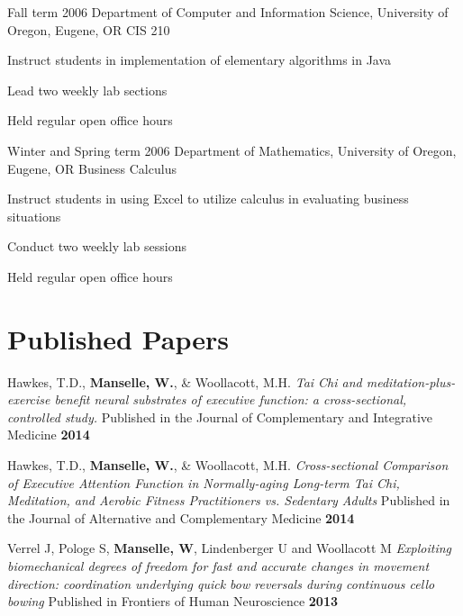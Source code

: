 \documentclass[10pt]{article} %
\begin{document}
\begin{itemize-noindent}

\job
{Fall term 2006}
{Department of Computer and Information Science, University of Oregon, Eugene, OR}
{CIS 210}

\begin{itemize-noindent}
\item{Instruct students in implementation of elementary algorithms in Java}
\item{Lead two weekly lab sections}
\item{Held regular open office hours}


\job
{Winter and Spring term 2006}
{Department of Mathematics, University of Oregon, Eugene, OR}
{Business Calculus}

\begin{itemize-noindent}
\item{Instruct students in using Excel to utilize calculus in evaluating business situations}
\item{Conduct two weekly lab sessions}
\item{Held regular open office hours}
\end{itemize-noindent}


\section{Published Papers}

\job
{Hawkes, T.D., \textbf{Manselle, W.}, & Woollacott, M.H.}
\textit{Tai Chi and meditation-plus-exercise benefit neural substrates of executive function: a cross-sectional, controlled study.}
{Published in the Journal of Complementary and Integrative Medicine}
\textbf{2014}

\job
{Hawkes, T.D., \textbf{Manselle, W.}, & Woollacott, M.H.}
\textit{Cross-sectional Comparison of Executive Attention Function in Normally-aging Long-term Tai Chi, Meditation, and Aerobic Fitness Practitioners vs. Sedentary Adults}
{Published in the Journal of Alternative and Complementary Medicine}
\textbf{2014}

\job
{Verrel J, Pologe S, \textbf{Manselle, W}, Lindenberger U and Woollacott M}
\textit{Exploiting biomechanical degrees of freedom for fast and accurate changes in movement direction: coordination underlying quick bow reversals during continuous cello bowing}
{Published in Frontiers of Human Neuroscience}
\textbf{2013}


\end{itemize-noindent}
\end{itemize-noindent}
\end{document}
